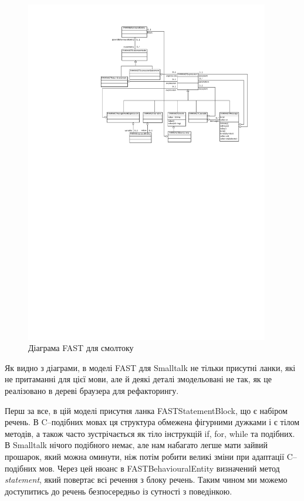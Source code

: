 \documentclass[12pt,a4paper]{article}
\begin{document}
\begin{figure}[h]
  \centering
    \includegraphics[width=0.95\textwidth]{SmalltalkASTClassDiagram}
  \caption{Діаграма FAST для смолтоку\label{smtFast}}
\end{figure}

Як видно з діаграми, в моделі FAST для Smalltalk не тільки присутні ланки, які не притаманні для цієї мови, але й деякі деталі змодельовані не так, як це реалізовано в дереві браузера для рефакторингу.

Перш за все, в цій моделі присутня ланка FASTStatementBlock, що є набіром речень. В C--подібних мовах ця структура обмежена фігурними дужками і є тілом методів, а також часто зустрічається як тіло інструкцій if, for, while та подібних. В Smalltalk нічого подібного немає, але нам набагато легше мати зайвий прошарок, який можна оминути, ніж потім робити великі зміни при адаптації C--подібних мов. Через цей нюанс в FASTBehaviouralEntity визначений метод \emph{statement}, який повертає всі речення з блоку речень. Таким чином ми можемо доступитись до речень безпосередньо із сутності з поведінкою.
\end{document}
